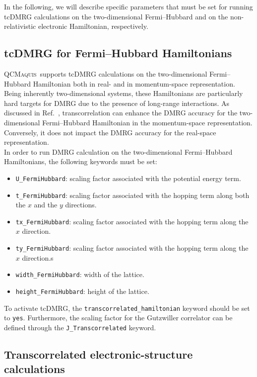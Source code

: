 \documentclass[bibliography=totoc,12pt,a4paper]{scrartcl}
\newcommand{\qcm}{\textsc{QCMaquis}}
\begin{document}
In the following, we will describe specific parameters that must be set for running tcDMRG calculations on the two-dimensional Fermi--Hubbard and on the non-relativistic electronic Hamiltonian, respectively.

\subsection{tcDMRG for Fermi--Hubbard Hamiltonians}
\label{subsec:tcDMRG-FH}

\qcm\ supports tcDMRG calculations on the two-dimensional Fermi--Hubbard Hamiltonian both in real- and in momentum-space representation.\cite{Baiardi2020_tcDMRG}
Being inherently two-dimensional systems, these Hamiltonians are particularly hard targets for DMRG due to the presence of long-range interactions.
As discussed in Ref.~, transcorrelation can enhance the DMRG accuracy for the two-dimensional Fermi--Hubbard Hamiltonian in the momentum-space representation.
Conversely, it does not impact the DMRG accuracy for the real-space representation. \\
In order to run DMRG calculation on the two-dimensional Fermi--Hubbard Hamiltonians, the following keywords must be set:

\begin{itemize}
  \item \texttt{U\_FermiHubbard}: scaling factor associated with the potential energy term.
  \item \texttt{t\_FermiHubbard}: scaling factor associated with the hopping term along both the $x$ and the $y$ directions.
  \item \texttt{tx\_FermiHubbard}: scaling factor associated with the hopping term along the $x$ direction.
  \item \texttt{ty\_FermiHubbard}: scaling factor associated with the hopping term along the $x$ direction.s
  \item \texttt{width\_FermiHubbard}: width of the lattice.
  \item \texttt{height\_FermiHubbard}: height of the lattice.
\end{itemize}

To activate tcDMRG, the \texttt{transcorrelated\_hamiltonian} keyword should be set to \texttt{yes}.
Furthermore, the scaling factor for the Gutzwiller correlator can be defined through the \texttt{J\_Transcorrelated} keyword.

\subsection{Transcorrelated electronic-structure calculations}
\label{subsec:TC-ElectronicStructure}
\end{document}
